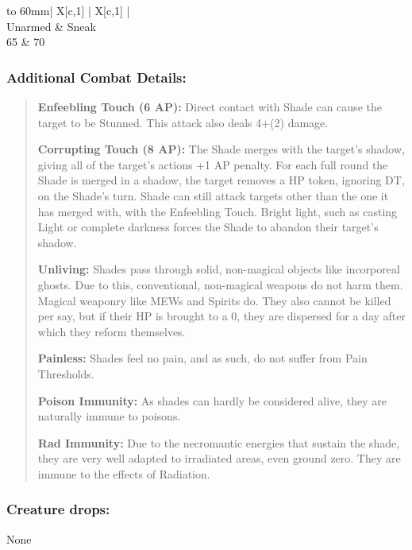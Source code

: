 \documentclass[11pt,a4paper,twocolumn]{book}
\begin{document}
	\bigskip
	{
		\begin{tabu} to 60mm{| X[c,1] | X[c,1] |}
			\hline
			 \\ \hline
			Unarmed & Sneak                          \\
			65      & 70                             \\ \hline
		\end{tabu}
		
	}
	
	\subsubsection*{Additional Combat Details:}
	\begin{verse}
		\textbf{Enfeebling Touch (6 AP):} Direct contact with Shade can cause the target to be Stunned. This attack also deals 4+(2) damage.
		
		\textbf{Corrupting Touch (8 AP):} The Shade merges with the target's shadow, giving all of the target's actions +1 AP penalty. For each full round the Shade is merged in a shadow, the target removes a HP token, ignoring DT, on the Shade's turn. Shade can still attack targets other than the one it has merged with, with the Enfeebling Touch. Bright light, such as casting Light or complete darkness forces the Shade to abandon their target's shadow. 
		
		\textbf{Unliving:} Shades pass through solid, non-magical objects like incorporeal ghosts. Due to this, conventional, non-magical weapons do not harm them. Magical weaponry like MEWs and Spirits do. They also cannot be killed per say, but if their HP is brought to a 0, they are dispersed for a day after which they reform themselves.
		
		\textbf{Painless:} Shades feel no pain, and as such, do not suffer from Pain Thresholds.
		
		\textbf{Poison Immunity:} As shades can hardly be considered alive, they are naturally immune to poisons.
		
		\textbf{Rad Immunity:} Due to the necromantic energies that sustain the shade, they are very well adapted to irradiated areas, even ground zero. They are immune to the effects of Radiation.
	\end{verse}
	
	\subsubsection*{Creature drops:}
	None
	
\end{document}
